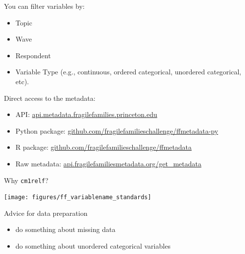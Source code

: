 \documentclass[aspectratio=169]{beamer}
\begin{document}
\begin{frame}

You can filter variables by:
\begin{itemize}
\item Topic
\item Wave
\item Respondent
\item Variable Type (e.g., continuous, ordered categorical, unordered categorical, etc).
\end{itemize}

\end{frame}	
\begin{frame}

Direct access to the metadata:
\begin{itemize}
\item API: \url{api.metadata.fragilefamilies.princeton.edu}
\item Python package: \url{github.com/fragilefamilieschallenge/ffmetadata-py}
\item R package: \url{github.com/fragilefamilieschallenge/ffmetadata}
\item Raw metadata: \url{api.fragilefamiliesmetadata.org/get_metadata}
\end{itemize}

\end{frame}
\begin{frame}

Why \texttt{cm1relf}? \pause

\begin{center}
\texttt{[image: figures/ff\_variablename\_standards]}
\end{center}

\end{frame}
\begin{frame}

Advice for data preparation
\begin{itemize}
\item do something about missing data
\item do something about unordered categorical variables
\end{itemize}

\end{frame}
\end{document}
